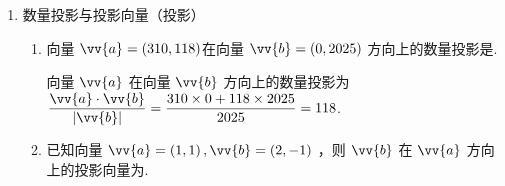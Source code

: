 \begin{enumerate}
\begin{enumerate}
        \begin{jieda}
            $|\vv{a} + \vv{b}| = |2\vv{a} - \vv{b}|$即$|\vv{a}|^2 + |\vv{b}|^2 + 2\vv{a} \cdot \vv{b} = 4|\vv{a}|^2 + |\vv{b}|^2 - 4\vv{a} \cdot \vv{b}$，故$|\vv{a}|^2 = 2\vv{a} \cdot \vv{b}$ \\
            又因为$|\vv{a} - \vv{b}| = \sqrt{3}$即$|\vv{a}|^2 + |\vv{b}|^2 - 2\vv{a} \cdot \vv{b} = 3$，代入$|\vv{a}|^2 = 2\vv{a} \cdot \vv{b}$可得$|\vv{b}| = \sqrt{3}$
        \end{jieda} 
        \item 已知单位向量$\vv{a}, \vv{b}$满足$|2\vv{a} + \vv{b}| = \sqrt{3}$，则$|\vv{a} - \vv{b}| = $
        \begin{jieda}
            首先根据$|2\vv{a} + \vv{b}| = \sqrt{3}$，平方后有$4 + 4 \vv{a} \cdot \vv{b} + 1 = 3$，故$\vv{a} \cdot \vv{b} = -\dfrac{1}{2}$ \\
            $|\vv{a} - \vv{b}| = \sqrt{(\vv{a} - \vv{b}) \cdot (\vv{a} - \vv{b})} = \sqrt{2 - 2\vv{a} \cdot \vv{b}} = \sqrt{3}$
        \end{jieda}
        \item 若单位向量 $\vv{a}$ 、 $\vv{b}$ 满足 $\vv{a}\bot \vv{b}$ ，则 $\left| {\vv{a} - \sqrt{3}\vv{b}}\right|  =$ .
    \end{enumerate}

    \item 数量投影与投影向量（投影）
    \begin{enumerate}
        \item 向量 $\vv{a} = (310, 118)$在向量 $\vv{b} = \left( {0,{2025}}\right)$ 方向上的数量投影是.
        \begin{jieda}
            向量 $\vv{a}$ 在向量 $\vv{b}$ 方向上的数量投影为 $\dfrac{\vv{a} \cdot  \vv{b}}{\left| \vv{b}\right| } = \dfrac{{310} \times  0 + {118} \times  {2025}}{2025} = {118}$.
        \end{jieda}

        \item 已知向量 $\vv{a} = \left( {1,1}\right) ,\vv{b} = \left( {2, - 1}\right)$ ，则 $\vv{b}$ 在 $\vv{a}$ 方向上的投影向量为.


\end{enumerate}
\end{enumerate}
